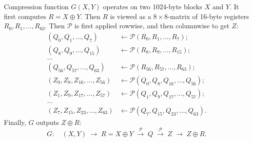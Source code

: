 \documentclass[a4paper]{article}
\begin{document}
Compression function ${G}(X,Y)$ operates on two 1024-byte blocks $X$ and $Y$. It first computes $R=X\oplus Y$. Then $R$ is viewed as a $8\times 8$-matrix of 16-byte registers $R_0, R_1,\ldots, R_{63}.$ Then
$\mathcal{P}$ is first applied rowwise, and then columnwise to get $Z$:
\begin{align*}
    (Q_0,Q_1,\ldots,Q_7) &\leftarrow \mathcal{P}(R_0,R_1,\ldots,R_7);\\
        (Q_8,Q_9,\ldots,Q_{15})&\leftarrow \mathcal{P}(R_8,R_9,\ldots,R_{15});\\
        \ldots&\\
        (Q_{56},Q_{57},\ldots,Q_{63})&\leftarrow \mathcal{P}(R_{56},R_{57},\ldots,R_{63});\\[10pt]
        (Z_0,Z_8,Z_{16},\ldots,Z_{56})&\leftarrow \mathcal{P}(Q_0,Q_8,Q_{16},\ldots,Q_{56});\\
        (Z_1,Z_9,Z_{17},\ldots,Z_{57})&\leftarrow     \mathcal{P}(Q_1,Q_9,Q_{17},\ldots,Q_{57});\\
        \ldots&\\
        (Z_7,Z_{15},Z_{23},\ldots,Z_{63})&\leftarrow \mathcal{P}(Q_7,Q_{15},Q_{23},\ldots,Q_{63}).
  \end{align*}
  Finally, $G$ outputs $Z\oplus R$:
  $$
  G:\quad (X,Y)\; \rightarrow\; R = X\oplus Y\; \xrightarrow{\mathcal{P}}\;Q\;\xrightarrow{\mathcal{P}}\;Z\;
  \rightarrow \;Z\oplus R.
  $$
  
\end{document}
